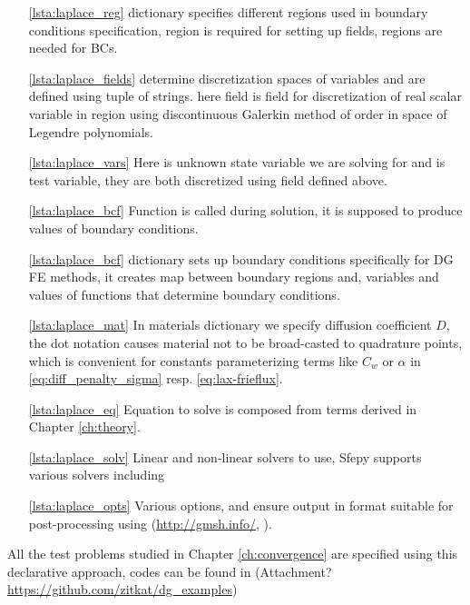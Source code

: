 \begin{itemize}
    \item[\ref{lsta:laplace_reg}]  dictionary specifies different 
    regions 
    used in    boundary conditions specification,  region is required for 
    setting up fields,  regions are needed for BCs.
    \item[\ref{lsta:laplace_fields}]   determine discretization spaces of 
    variables and are defined using tuple of strings.
     here field  is field for discretization of real scalar 
    variable in region  using discontinuous Galerkin method of order 
     in space of Legendre polynomials. 
    \item[\ref{lsta:laplace_vars}]  Here  is unknown state variable we are 
    solving for and  is test variable, they are both discretized using field 
     defined above.
    \item[\ref{lsta:laplace_bcf}]  Function  is called during solution, it 
    is supposed to produce values of boundary conditions.
    \item[\ref{lsta:laplace_bcf}]  dictionary sets up boundary 
    conditions specifically for DG FE methods, it creates map between boundary regions 
    and, variables and values of functions that determine boundary conditions.
    \item[\ref{lsta:laplace_mat}] In materials dictionary we specify diffusion 
    coefficient $D$, the dot notation  
    causes material not to be broad-casted to quadrature points, which is convenient for 
    constants parameterizing terms like $C_w$ or $\alpha$ in 
    \eqref{eq:diff_penalty_sigma} 
    resp. \eqref{eq:lax-frieflux}.
    \item[\ref{lsta:laplace_eq}] Equation to solve is composed from terms derived in 
    Chapter \ref{ch:theory}.
    
    \item[\ref{lsta:laplace_solv}] Linear and non-linear solvers to use, Sfepy supports 
    various solvers including  \cite{MUMPS:2}
    
    \item[\ref{lsta:laplace_opts}] Various options,  and 
     ensure output in format suitable for 
    post-processing using  (\url{http://gmsh.info/}, \cite{Remacle2007}).
\end{itemize}
All the test problems studied in Chapter \ref{ch:convergence} are specified using this 
declarative approach, codes can be found in (\todo Attachment? 
\url{https://github.com/zitkat/dg_examples})

